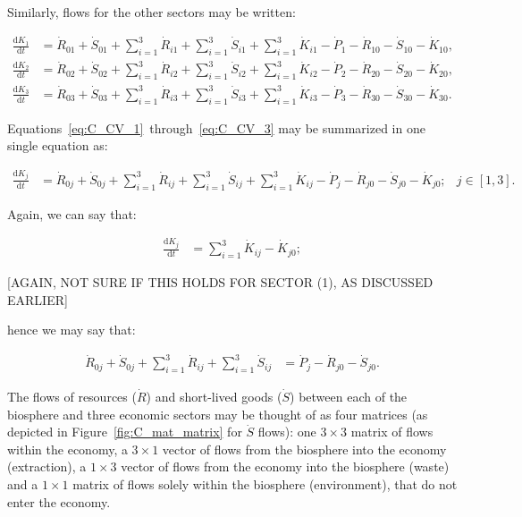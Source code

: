 Similarly, flows for the other sectors may be written:

\begin{align} \label{eq:C_CV_1}
	\frac{\mathrm{d}K_{1}}{\mathrm{d}t}		
	& =  \dot{R}_{01} 
	+ \dot{S}_{01}
	+ \sum_{i = 1}^{3}\dot{R}_{i1}
	+ \sum_{i = 1}^{3}\dot{S}_{i1}
	+ \sum_{i = 1}^{3}\dot{K}_{i1}
	- \dot{P}_{1}
	- \dot{R}_{10} 
	- \dot{S}_{10}
	- \dot{K}_{10},										\\
	\label{eq:C_CV_2}
	\frac{\mathrm{d}K_{2}}{\mathrm{d}t}		
	& =  \dot{R}_{02} 
	+ \dot{S}_{02}
	+ \sum_{i = 1}^{3}\dot{R}_{i2}
	+ \sum_{i = 1}^{3}\dot{S}_{i2}
	+ \sum_{i = 1}^{3}\dot{K}_{i2}
	- \dot{P}_{2}
	- \dot{R}_{20} 
	- \dot{S}_{20}
	- \dot{K}_{20},										\\	
	\label{eq:C_CV_3}
	\frac{\mathrm{d}K_{3}}{\mathrm{d}t}		
	& =  \dot{R}_{03} 
	+ \dot{S}_{03}
	+ \sum_{i = 1}^{3}\dot{R}_{i3}
	+ \sum_{i = 1}^{3}\dot{S}_{i3}
	+ \sum_{i = 1}^{3}\dot{K}_{i3}
	- \dot{P}_{3}
	- \dot{R}_{30} 
	- \dot{S}_{30}
	- \dot{K}_{30}.										
\end{align}

Equations~\ref{eq:C_CV_1}~through~\ref{eq:C_CV_3} may be summarized
in one single equation as:

\begin{align} \label{eq:C_CV_1_to_3_b}
	\frac{\mathrm{d}K_{j}}{\mathrm{d}t}		
	& =  \dot{R}_{0j} 
	+ \dot{S}_{0j}
	+ \sum_{i = 1}^{3}\dot{R}_{ij}
	+ \sum_{i = 1}^{3}\dot{S}_{ij}
	+ \sum_{i = 1}^{3}\dot{K}_{ij}
	- \dot{P}_{j}
	- \dot{R}_{j0} 
	- \dot{S}_{j0}
	- \dot{K}_{j0};
	& j \in \left[1,3\right].
\end{align}

Again, we can say that:

\begin{align} \label{eq:C_CV_K_balance}
	\frac{\mathrm{d}K_{j}}{\mathrm{d}t}		
	& =  \sum_{i = 1}^{3}\dot{K}_{ij}
	- \dot{K}_{j0};
\end{align}

[AGAIN, NOT SURE IF THIS HOLDS FOR SECTOR (1), AS DISCUSSED EARLIER]

\noindent hence we may say that:

\begin{align} \label{eq:C_CV_1_to_3_c}
	\dot{R}_{0j} 
	+ \dot{S}_{0j}
	+ \sum_{i = 1}^{3}\dot{R}_{ij}
	+ \sum_{i = 1}^{3}\dot{S}_{ij}
	& = \dot{P}_{j}
	- \dot{R}_{j0} 
	- \dot{S}_{j0}.
\end{align}

The flows of resources ($\dot{R}$) and short-lived goods ($\dot{S}$) between each of the biosphere and three economic sectors may be thought of as four matrices (as depicted in Figure~\ref{fig:C_mat_matrix} for $\dot{S}$ flows): one $3\times3$ matrix of flows within the economy, a $3\times1$ vector of flows from the biosphere into the economy (extraction), a $1\times3$ vector of flows from the economy into the biosphere (waste) and a $1\times1$ matrix of flows solely within the biosphere (environment), that do not enter the economy.

